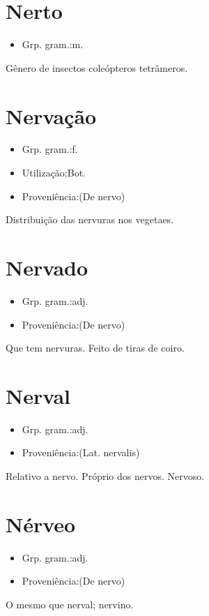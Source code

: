 \section{Nerto}
\begin{itemize}
\item {Grp. gram.:m.}
\end{itemize}
Gênero de insectos coleópteros tetrâmeros.
\section{Nervação}
\begin{itemize}
\item {Grp. gram.:f.}
\end{itemize}
\begin{itemize}
\item {Utilização:Bot.}
\end{itemize}
\begin{itemize}
\item {Proveniência:(De \textunderscore nervo\textunderscore )}
\end{itemize}
Distribuição das nervuras nos vegetaes.
\section{Nervado}
\begin{itemize}
\item {Grp. gram.:adj.}
\end{itemize}
\begin{itemize}
\item {Proveniência:(De \textunderscore nervo\textunderscore )}
\end{itemize}
Que tem nervuras.
Feito de tiras de coiro.
\section{Nerval}
\begin{itemize}
\item {Grp. gram.:adj.}
\end{itemize}
\begin{itemize}
\item {Proveniência:(Lat. \textunderscore nervalis\textunderscore )}
\end{itemize}
Relativo a nervo.
Próprio dos nervos.
Nervoso.
\section{Nérveo}
\begin{itemize}
\item {Grp. gram.:adj.}
\end{itemize}
\begin{itemize}
\item {Proveniência:(De \textunderscore nervo\textunderscore )}
\end{itemize}
O mesmo que \textunderscore nerval\textunderscore ; nervino.
